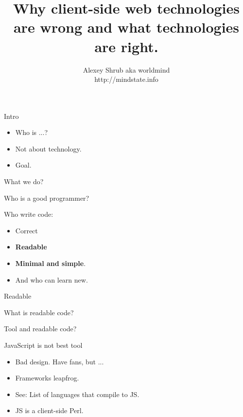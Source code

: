 \documentclass{beamer}
\title{Why client-side web technologies are wrong and what technologies are right.}
\author{Alexey Shrub aka worldmind\\http://mindstate.info}
\date{}
\renewcommand{\alert}[1]{\textbf{#1}}
\begin{document}
\maketitle

\begin{frame}{Intro}
 \begin{itemize}
  \item Who is ...?
  \pause
  \item Not about technology.
  \pause
  \item Goal.
 \end{itemize}
\end{frame}

\begin{frame}{What we do?}
 \begin{center}
  Who is a good programmer?
 \end{center}
\end{frame}

\begin{frame}{Who write code:}
 \begin{itemize}
  \item Correct
  \item \alert{Readable}
  \item \alert{Minimal and simple}.
  \item And who can learn new.
 \end{itemize}
\end{frame}

\begin{frame}{Readable}
 \begin{center}
  What is readable code?
 \end{center}
\end{frame}

\begin{frame}[fragile]{Tool and readable code?}
 
 \pause
 \hrulefill
 
\end{frame}

\begin{frame}{JavaScript is not best tool}
 \begin{itemize}
  \item Bad design. Have fans, but ...
  \pause
  \item Frameworks leapfrog.
  \pause
  \item See: List of languages that compile to JS.
  \pause
  \item JS is a client-side Perl.
 \end{itemize}
\end{frame}
\end{document}
